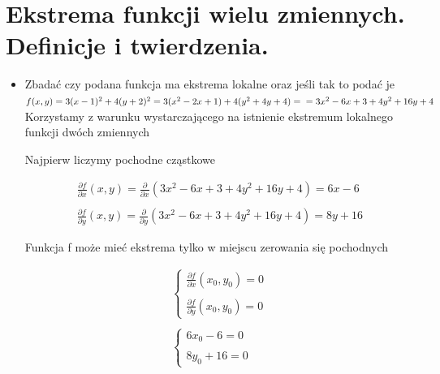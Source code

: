 \documentclass[12pt]{article}
\begin{document}
    \section{Ekstrema funkcji wielu zmiennych. Definicje i twierdzenia.}
\begin{itemize}
            \item Zbadać czy podana funkcja ma ekstrema lokalne oraz jeśli tak to podać je\\
            
            $f(x,y) = 3(x-1)^2 + 4(y+2)^2 = 3(x^2 - 2x +1) + 4(y^2 + 4y + 4) =\\ = 3x^2 - 6x + 3 + 4y^2 + 16y + 4$\\
            
            Korzystamy z warunku wystarczającego na istnienie ekstremum lokalnego funkcji dwóch zmiennych
            
            Najpierw liczymy pochodne cząstkowe
            
            \begin{equation}
                \begin{aligned}
                    \frac{\partial f}{\partial x} (x,y) = \frac{\partial }{\partial x} \left( 3x^2 - 6x + 3 + 4y^2 + 16y + 4 \right) = 6x - 6 \\
                    \\
                    \frac{\partial f}{\partial y} (x,y) = \frac{\partial }{\partial y} \left( 3x^2 - 6x + 3 + 4y^2 + 16y + 4 \right) = 8y + 16
                \end{aligned}
            \end{equation}
            
            Funkcja f może mieć ekstrema tylko w miejscu zerowania się pochodnych
            
            \begin{equation}
                \begin{aligned}
                    \left \{ \begin{array}{lr}
                                        \frac{\partial f}{\partial x} (x_0, y_0 ) = 0 \\
                                        \\
                                        \frac{\partial f}{\partial y} (x_0, y_0) = 0
                    \end{array} \right.
                    \\
                    \\
                    \left \{ \begin{array}{lr}
                                        6x_0 - 6 = 0 \\
                                        \\
                                        8y_0 + 16 = 0
                    \end{array}\right.
                \end{aligned}
            \end{equation}
            

\end{itemize}
\end{document}
